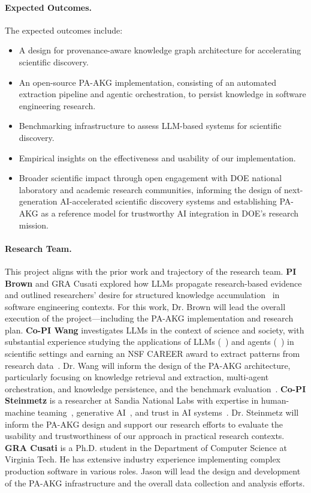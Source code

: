 \documentclass{files/proposalnsf}
\begin{document}
\paragraph{Expected Outcomes.} The expected outcomes include:
\begin{itemize}
    \item A design for provenance-aware knowledge graph architecture for accelerating scientific discovery.
    \item An open-source PA-AKG implementation, consisting of an automated extraction pipeline and agentic orchestration, to persist knowledge in software engineering research.
    \item Benchmarking infrastructure to assess LLM-based systems for scientific discovery.
    \item Empirical insights on the effectiveness and usability of our implementation.
    \item Broader scientific impact through open engagement with DOE national laboratory and academic research communities, informing the design of next-generation AI-accelerated scientific discovery systems and establishing PA-AKG as a reference model for trustworthy AI integration in DOE's research mission.
\end{itemize}

\paragraph{Research Team.} This project aligns with the prior work and trajectory of the research team.
\textbf{PI Brown} and GRA Cusati explored how LLMs propagate research-based evidence~\cite{brown2025esem} and outlined researchers' desire for structured knowledge accumulation~\cite{cusati2026fose} in software engineering contexts. For this work, Dr. Brown will lead the overall execution of the project---including the PA-AKG implementation and research plan. \textbf{Co-PI Wang} investigates LLMs in the context of science and society, with substantial experience studying the applications of LLMs (\ie~\cite{bi2024ai,srivastava2025llmthinkbench}) and agents (\ie~\cite{lu2024triageagent,latimer2025hindsight}) in scientific settings and earning an NSF CAREER award to extract patterns from research data~\cite{wang_career}. Dr. Wang will inform the design of the PA-AKG architecture, particularly focusing on knowledge retrieval and extraction, multi-agent orchestration, and knowledge persistence, and the benchmark evaluation~\cite{srivastava2025beyondbench}. \textbf{Co-PI Steinmetz} is a researcher at Sandia National Labs with expertise in human-machine teaming~\cite{chance2023towards,powell2021coordination}, generative AI~\cite{krofcheck2023overview,layton2025mstd}, and trust in AI systems~\cite{steinmetz2025trust,naugle2025trusted}. Dr. Steinmetz will inform the PA-AKG design and support our research efforts to evaluate the usability and trustworthiness of our approach in practical research contexts. \textbf{GRA Cusati} is a Ph.D. student in the Department of Computer Science at Virginia Tech. He has extensive industry experience implementing complex production software in various roles. Jason will lead the design and development of the PA-AKG infrastructure and the overall data collection and analysis efforts.
\end{document}
